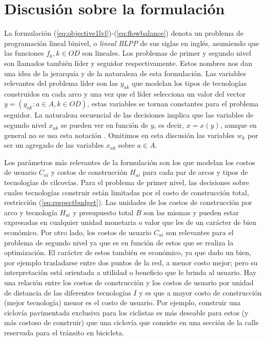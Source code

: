 \section*{Discusión sobre la formulación}

La formulación (\ref{eq:objective1lvl})-(\ref{eq:flowbalance}) denota un problema de programación lineal binivel, o {\it lineal BLPP} de sus siglas en inglés, asumiendo que las funciones $f_k, k\in OD$ son lineales. Los problemas de primer y segundo nivel son llamados también líder y seguidor respectivamente. Estos nombres nos dan una idea de la jerarquía y de la naturaleza de esta formulación. Las variables relevantes del problema líder son las $y_{ak}$ que modelan los tipos de tecnologías construidos en cada arco y una vez que el líder selecciona un valor del vector $y = \left( y_{ak}: a \in A, k \in OD \right)$, estas variables se tornan constantes para el problema seguidor. La naturaleza secuencial de las decisiones implica que las variables de segundo nivel $x_{ak}$ se pueden ver en función de $y$, es decir, $x = x(y)$, aunque en general no se usa esta notación \parencite{bardbook}. Omitimos en esta discusión las variables $w_k$ por ser un agregado de las variables $x_{ak}$ sobre $a \in A$.


Los parámetros más relevantes de la formulación son los que modelan los costos de usuario $C_{ai}$ y costos de construcción $H_{ai}$ para cada par de arcos y tipos de tecnologías de cilcovías. Para el problema de primer nivel, las decisiones sobre cuales tecnologías construir están limitadas por el costo de construcción total, restricción (\ref{eq:respectbudget}). Las unidades de los costos de construcción por arco y tecnología $H_{ai}$ y presupuesto total $B$ son las mismas y pueden estar expresadas en cualquier unidad monetaria o valor que les de un carácter de bien económico. Por otro lado, los costos de usuario $C_{ai}$ son relevantes para el problema de segundo nivel ya que es en función de estos que se realiza la optimización. El carácter de estos también es económico, ya que dado un bien, por ejemplo trasladarse entre dos puntos de la red, a menor costo mejor; pero su interpretación está orientada a utilidad o beneficio que le brinda al usuario. Hay una relación entre los costos de construcción y los costos de usuario por unidad de distancia de las diferentes tecnologías $I$ y es que a mayor costo de construcción (mejor tecnología) menor es el costo de usuario. Por ejemplo, construir una ciclovía pavimentada exclusiva para los ciclistas es más deseable para estos (y más costoso de construir) que una ciclovía que consiste en una sección de la calle reservada para el tránsito en bicicleta.

